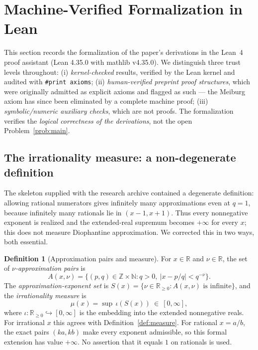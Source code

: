 \documentclass[11pt]{amsart}
\theoremstyle{definition}
\newtheorem{definition}[theorem]{Definition}
\theoremstyle{remark}
\numberwithin{equation}{section}
\newcommand{\R}{\mathbb{R}}
\newcommand{\Z}{\mathbb{Z}}
\newcommand{\N}{\mathbb{N}}
\newcommand{\irr}{\mu}
\begin{document}
\section{Machine-Verified Formalization in Lean}\label{sec:lean}

This section records the formalization of the paper's derivations in the Lean~4 proof assistant (Lean 4.35.0 with mathlib v4.35.0). We distinguish three trust levels throughout: (i) \emph{kernel-checked} results, verified by the Lean kernel and audited with \texttt{\#print axioms}; (ii) \emph{human-verified preprint proof structures}, which were originally admitted as explicit axioms and flagged as such --- the Meiburg axiom has since been eliminated by a complete machine proof; (iii) \emph{symbolic/numeric auxiliary checks}, which are not proofs. The formalization verifies the \emph{logical correctness of the derivations}, not the open Problem~\ref{prob:main}.

\subsection{The irrationality measure: a non-degenerate definition}\label{sec:lean-def}

The skeleton supplied with the research archive contained a degenerate definition: allowing rational numerators gives infinitely many approximations even at $q=1$, because infinitely many rationals lie in $(x-1,x+1)$. Thus every nonnegative exponent is realized and the extended-real supremum becomes $+\infty$ for every $x$; this does not measure Diophantine approximation. We corrected this in two ways, both essential.

\begin{definition}[Approximation pairs and measure]\label{def:lean-measure}
For $x\in\R$ and $\nu\in\R$, the set of \emph{$\nu$-approximation pairs} is
\[
A(x,\nu)=\{(p,q)\in\Z\times\N: q>0,\ |x-p/q|<q^{-\nu}\}.
\]
The \emph{approximation-exponent set} is $S(x)=\{\nu\in\R_{\ge0}: A(x,\nu)\text{ is infinite}\}$, and the \emph{irrationality measure} is
\[
\irr(x)=\sup\,\iota(S(x))\ \in\ [0,\infty],
\]
where $\iota:\R_{\ge0}\hookrightarrow[0,\infty]$ is the embedding into the extended nonnegative reals. For irrational $x$ this agrees with Definition~\ref{def:measure}. For rational $x=a/b$, the exact pairs $(ka,kb)$ make every exponent admissible, so this formal extension has value $+\infty$. No assertion that it equals $1$ on rationals is used.
\end{definition}
\end{document}
